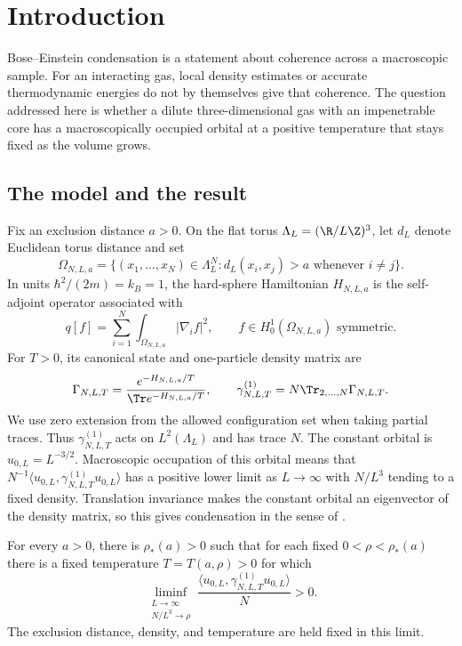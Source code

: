 \section{Introduction}\label{sec:introduction}

Bose--Einstein condensation is a statement about coherence across a
macroscopic sample. For an interacting gas, local density estimates or
accurate thermodynamic energies do not by themselves give that coherence.
The question addressed here is whether a dilute three-dimensional gas
with an impenetrable core has a macroscopically occupied orbital at a
positive temperature that stays fixed as the volume grows.

\subsection{The model and the result}

Fix an exclusion distance $a>0$. On the flat torus
$\Lambda_L=(\R/L\Z)^3$, let $d_L$ denote Euclidean torus distance and set
\[
 \Omega_{N,L,a}
 =\{(x_1,\ldots,x_N)\in\Lambda_L^N:
                   d_L(x_i,x_j)>a\text{ whenever }i\ne j\}.
\]
In units $\hbar^2/(2m)=k_B=1$, the hard-sphere Hamiltonian
$H_{N,L,a}$ is the self-adjoint operator associated with
\[
 q[f]=\sum_{i=1}^N\int_{\Omega_{N,L,a}}|\nabla_i f|^2,
 \qquad f\in H^1_0(\Omega_{N,L,a})\text{ symmetric}.
\]
For $T>0$, its canonical state and one-particle density matrix are
\[
 \Gamma_{N,L,T}=
 \frac{e^{-H_{N,L,a}/T}}{\Tr e^{-H_{N,L,a}/T}},\qquad
 \gamma^{(1)}_{N,L,T}=N\Tr_{2,\ldots,N}\Gamma_{N,L,T}.
\]
We use zero extension from the allowed configuration set when taking
partial traces. Thus $\gamma^{(1)}_{N,L,T}$ acts on $L^2(\Lambda_L)$
and has trace $N$. The constant orbital is $u_{0,L}=L^{-3/2}$.
Macroscopic occupation of this orbital means that
$N^{-1}\langle u_{0,L},\gamma^{(1)}_{N,L,T}u_{0,L}\rangle$ has a
positive lower limit as $L\to\infty$ with $N/L^3$ tending to a fixed
density. Translation invariance makes the constant orbital an eigenvector
of the density matrix, so this gives condensation in the sense of
\citet{PenroseOnsager1956}.

\begin{theorem}\label{thm:main}
For every $a>0$, there is $\rho_*(a)>0$ such that for each fixed
$0<\rho<\rho_*(a)$ there is a fixed temperature $T=T(a,\rho)>0$ for which
\[
 \liminf_{\substack{L\to\infty\\N/L^3\to\rho}}
 \frac{\langle u_{0,L},\gamma^{(1)}_{N,L,T}u_{0,L}\rangle}{N}>0.
\]
The exclusion distance, density, and temperature are held fixed in this
limit.
\end{theorem}

